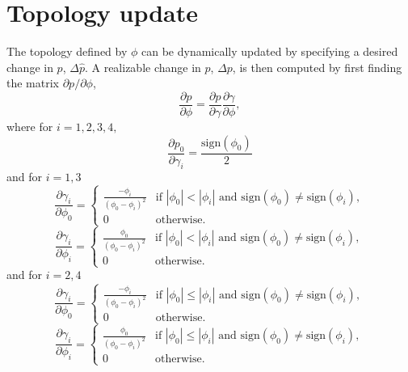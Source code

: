 \documentclass{article}
\begin{document}
\section{Topology update}
The topology defined by $\phi$ can be dynamically updated by specifying a desired change in $p$, $\Delta \hat{p}$. A realizable change in $p$, $\Delta p$, is then computed by first finding the matrix $\partial p / \partial \phi$, 
\begin{equation}
    \frac{\partial p}{\partial \phi} = 
    \frac{\partial p}{\partial \gamma} \frac{\partial \gamma}{\partial \phi},
\end{equation}
where for $i = 1,2,3,4,$
\begin{equation}
    \frac{\partial p_0}{\partial \gamma_i} = \frac{\text{sign}(\phi_0)}{2}
\end{equation}
and for $i = 1,3$
\begin{equation}
    \frac{\partial \gamma_i}{\partial \phi_0} = 
    \begin{cases}
        \frac{-\phi_i}{(\phi_0 - \phi_i)^2} & 
            \text{if } |\phi_0| < |\phi_i| \text{ and } 
            \text{sign}(\phi_0) \ne \text{sign}(\phi_i), \\
        0 & \text{otherwise.}
    \end{cases}
\end{equation}
\begin{equation}
    \frac{\partial \gamma_i}{\partial \phi_i} = 
    \begin{cases}
        \frac{\phi_0}{(\phi_0 - \phi_i)^2} & 
            \text{if } |\phi_0| < |\phi_i| \text{ and } 
            \text{sign}(\phi_0) \ne \text{sign}(\phi_i), \\
        0 & \text{otherwise.}
    \end{cases}
\end{equation}
and for $i = 2,4$
\begin{equation}
    \frac{\partial \gamma_i}{\partial \phi_0} = 
    \begin{cases}
        \frac{-\phi_i}{(\phi_0 - \phi_i)^2} & 
            \text{if } |\phi_0| \le |\phi_i| \text{ and } 
            \text{sign}(\phi_0) \ne \text{sign}(\phi_i), \\
        0 & \text{otherwise.}
    \end{cases}
\end{equation}
\begin{equation}
    \frac{\partial \gamma_i}{\partial \phi_i} = 
    \begin{cases}
        \frac{\phi_0}{(\phi_0 - \phi_i)^2} & 
            \text{if } |\phi_0| \le |\phi_i| \text{ and } 
            \text{sign}(\phi_0) \ne \text{sign}(\phi_i), \\
        0 & \text{otherwise.}
    \end{cases}
\end{equation}
\end{document}
